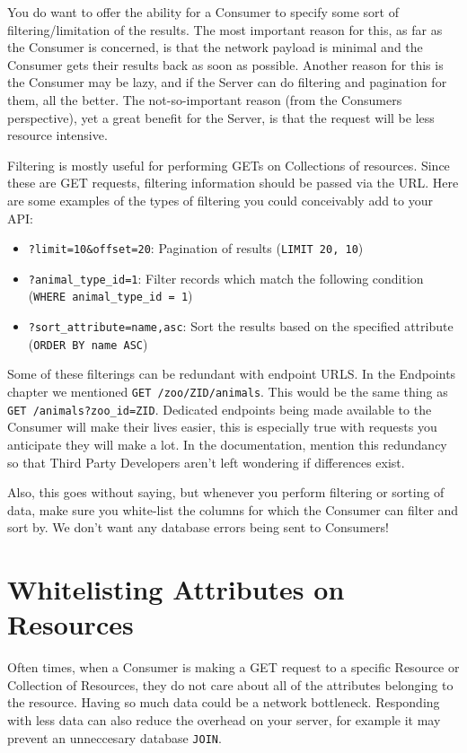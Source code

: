 \documentclass{book}
\begin{document}
You do want to offer the ability for a Consumer to specify some sort of filtering/limitation of the results. The most important reason for this, as far as the Consumer is concerned, is that the network payload is minimal and the Consumer gets their results back as soon as possible. Another reason for this is the Consumer may be lazy, and if the Server can do filtering and pagination for them, all the better. The not-so-important reason (from the Consumers perspective), yet a great benefit for the Server, is that the request will be less resource intensive.

Filtering is mostly useful for performing GETs on Collections of resources. Since these are GET requests, filtering information should be passed via the URL. Here are some examples of the types of filtering you could conceivably add to your API:

\begin{itemize}
\item \texttt{?limit=10\&offset=20}: Pagination of results (\texttt{LIMIT 20, 10})
\item \texttt{?animal\_type\_id=1}: Filter records which match the following condition (\texttt{WHERE animal\_type\_id = 1})
\item \texttt{?sort\_attribute=name,asc}: Sort the results based on the specified attribute (\texttt{ORDER BY name ASC})
\end{itemize}

Some of these filterings can be redundant with endpoint URLS. In the Endpoints chapter we mentioned \texttt{GET /zoo/ZID/animals}. This would be the same thing as \texttt{GET /animals?zoo\_id=ZID}. Dedicated endpoints being made available to the Consumer will make their lives easier, this is especially true with requests you anticipate they will make a lot. In the documentation, mention this redundancy so that Third Party Developers aren't left wondering if differences exist.

Also, this goes without saying, but whenever you perform filtering or sorting of data, make sure you white-list the columns for which the Consumer can filter and sort by. We don't want any database errors being sent to Consumers!


\section{Whitelisting Attributes on Resources}

Often times, when a Consumer is making a GET request to a specific Resource or Collection of Resources, they do not care about all of the attributes belonging to the resource. Having so much data could be a network bottleneck. Responding with less data can also reduce the overhead on your server, for example it may prevent an unneccesary database \texttt{JOIN}.
\end{document}
